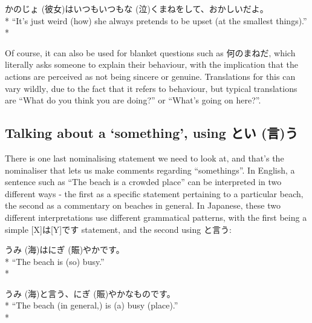 \documentclass[11pt, b5paper, twoside, openright, onecolumn]{book}
\makeatletter
\newcommand*{\rubystack}[2]{{\relscale{0.5}%
  \begin{tabular}[b]{@{}c@{}}%
    {#1}\\%
   {\textscale{2}{#2}}%
  \end{tabular}}%
}
\DeclareRobustCommand*{\ruby}[2]{%
  \mbox{%
    \setlength{\parskip}{0ex}%
    \BeginAccSupp{method=pdfstringdef,ActualText={#1}}%
      \rubystack{\phantom{#2}}{#1}%
      \llap{%
        \rubystack{#2}{\phantom{#1}}%
      }%
    \EndAccSupp{}%
  }%
}
\renewcommand*{\ruby}[2]{#2 (#1)}%
\newenvironment{exampleblock}{
\setlength{\parindent}{0.6in}
\begin{minipage}[t]{\dimexpr\textwidth-\parindent}}
{\end{minipage}}
\makeatother
\begin{document}
\begin{exampleblock}
\ruby{彼女}{かのじょ}はいつもいつも\ruby{泣}{な}くまねをして、おかしいだよ。 \\* 
“It’s just weird (how) she always pretends to be upset (at the smallest things).” \\* 
\end{exampleblock}
\vspace{0.2cm}

Of course‚ it can also be used for blanket questions such as 何のまねだ‚ which literally asks someone to explain their behaviour‚ with the implication that the actions are perceived as not being sincere or genuine. Translations for this can vary wildly‚ due to the fact that it refers to behaviour‚ but typical translations are “What do you think you are doing?” or “What’s going on here?”.

\subsection{Talking about a ‘something’‚ using と\ruby{言}{い}う}

There is one last nominalising statement we need to look at‚ and that’s the nominaliser that lets us make comments regarding “somethings”. In English‚ a sentence such as “The beach is a crowded place” can be interpreted in two different ways - the first as a specific statement pertaining to a particular beach‚ the second as a commentary on beaches in general. In Japanese‚ these two different interpretations use different grammatical patterns‚ with the first being a simple [X]は[Y]です statement‚ and the second using と言う:

\vspace{0.4cm}
\begin{exampleblock}
\ruby{海}{うみ}は\ruby{賑}{にぎ}やかです。 \\* 
“The beach is (so) busy.” \\* 
\end{exampleblock}
\vspace{0.2cm}

\begin{exampleblock}
\ruby{海}{うみ}と言う、\ruby{賑}{にぎ}やかなものです。 \\* 
“The beach (in general‚) is (a) busy (place).” \\* 
\end{exampleblock}
\vspace{0.2cm}
\end{document}

